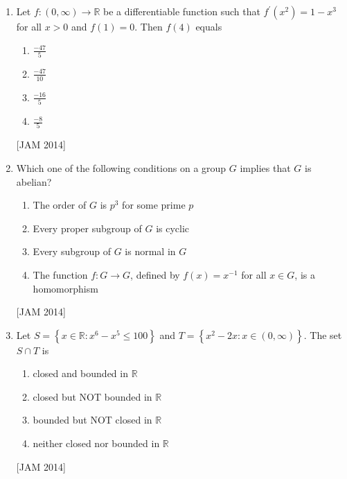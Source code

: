 \begin{enumerate}
\begin{enumerate}
 \item $\frac{\pi}{3}$ 
\item $2 \pi$ 
\item $\frac{4 \pi}{3}$ 
\item $4 \pi$
\end{enumerate}
\hfill [JAM 2014]



\item  Let $f:(0, \infty) \rightarrow \mathbb{R}$ be a differentiable function such that $f^{\prime}\left(x^{2}\right)=1-x^{3}$ for all $x>0$ and $f(1)=0$. Then $f(4)$ equals 

\begin{enumerate}
 \item $\frac{-47}{5}$ 
\item $\frac{-47}{10}$ 
\item $\frac{-16}{5}$ 
\item $\frac{-8}{5}$
\end{enumerate}
\hfill [JAM 2014]

 \item  Which one of the following conditions on a group $G$ implies that $G$ is abelian? 

\begin{enumerate}
 \item The order of $G$ is $p^{3}$ for some prime $p$ 
\item Every proper subgroup of $G$ is cyclic 
\item Every subgroup of $G$ is normal in $G$ 
\item The function $f: G \rightarrow G$, defined by $f(x)=x^{-1}$ for all $x \in G$, is a homomorphism
\end{enumerate}
\hfill [JAM 2014]



\item  Let $S=\left\{x \in \mathbb{R}: x^{6}-x^{5} \leq 100\right\}$ and $T=\left\{x^{2}-2 x: x \in(0, \infty)\right\}$. The set $S \cap T$ is 

\begin{enumerate}
 \item closed and bounded in $\mathbb{R}$ 
\item closed but NOT bounded in $\mathbb{R}$ 
\item bounded but NOT closed in $\mathbb{R}$ 
\item neither closed nor bounded in $\mathbb{R}$
\end{enumerate}
\hfill [JAM 2014]




\end{enumerate}
